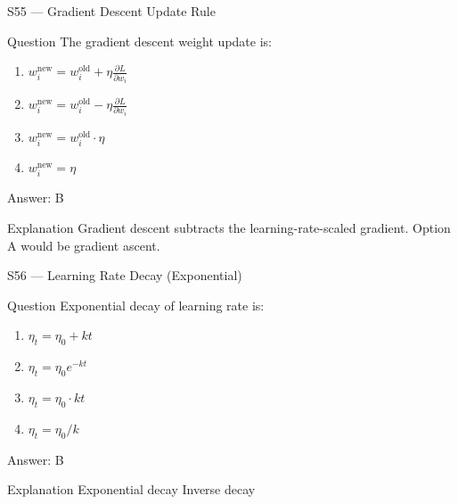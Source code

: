 \documentclass[aspectratio=169,8pt]{beamer}
\begin{document}
	\begin{frame}{S55 --- Gradient Descent Update Rule}
		\begin{block}{Question}
			The gradient descent weight update is:
			\begin{enumerate}
				\item $w_i^{\text{new}} = w_i^{\text{old}} + \eta \frac{\partial L}{\partial w_i}$
				\item $w_i^{\text{new}} = w_i^{\text{old}} - \eta \frac{\partial L}{\partial w_i}$
				\item $w_i^{\text{new}} = w_i^{\text{old}} \cdot \eta$
				\item $w_i^{\text{new}} = \eta$
			\end{enumerate}
		\end{block}
		\begin{exampleblock}{Answer: B}\end{exampleblock}
		\begin{block}{Explanation}
			Gradient descent subtracts the learning-rate-scaled gradient. Option A would be gradient ascent.
		\end{block}
	\end{frame}
	
	\begin{frame}{S56 --- Learning Rate Decay (Exponential)}
		\begin{block}{Question}
			Exponential decay of learning rate is:
			\begin{enumerate}
				\item $\eta_t = \eta_0 + kt$
				\item $\eta_t = \eta_0 e^{-kt}$
				\item $\eta_t = \eta_0 \cdot kt$
				\item $\eta_t = \eta_0/k$
			\end{enumerate}
		\end{block}
		\begin{exampleblock}{Answer: B}\end{exampleblock}
		\begin{block}{Explanation}
			Exponential decay   Inverse decay   
		\end{block}
	\end{frame}
	
\end{document}

